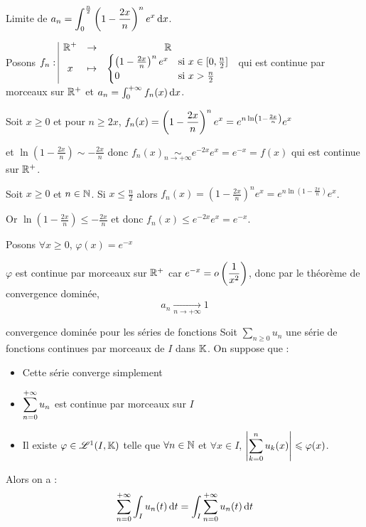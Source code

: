 \begin{exemple}
    Limite de $\displaystyle a_n = \int_{0}^{\frac n 2 } \left( 1 - \frac{2x} n \right)^n e^x \,\mathrm{d}x$.

    Posons $f_n: \space \begin{array}{|ccc} \displaystyle \mathbb{R}^+ & \to & \displaystyle \mathbb{R} \\ \displaystyle x & \mapsto & \displaystyle \begin{cases}
        \left( 1 - \frac{2x} n \right)^n e^x & \text{si } x \in [0, \frac n 2] \\
        0 & \text{si } x > \frac n 2
    \end{cases} \end{array}$ qui est continue par morceaux sur $\mathbb{R}^+$ et 
    $a_n = \int_0^{+ \infty} f_n(x) \,\mathrm{d}x$.

    \avspace Soit $x \geqslant 0$ et pour $n \geqslant 2x$, 
    $\displaystyle f_n(x) = \left( 1 - \frac{2x} n \right)^n e^x = e^{n \ln \left( 1 - \frac{2x} n \right)} e^x$

    et $\ln \left( 1 - \frac{2x} n \right) \sim - \frac{2x} n$ donc $f_n(x) \underset{n \to + \infty}{\sim} e^{-2x} e^x = e^{-x} = f(x)$ 
    qui est continue sur $\mathbb{R}^+$.

    Soit $x \geqslant 0$ et $n \in \mathbb{N}$. Si $x \leqslant \frac n 2$ alors
    $f_n(x) = \left( 1 - \frac{2x} n \right)^n e^x = e^{n \ln \left( 1 - \frac{2x} n \right)} e^x$.
    
    Or $\ln \left( 1 - \frac{2x} n \right) \leqslant - \frac{2x} n$  
    et donc $f_n(x) \leqslant e^{-2x} e^x = e^{-x}$.

    Posons $\forall x \geqslant 0$, $\varphi(x) = e^{-x}$ 

    $\varphi$ est continue par morceaux sur $\mathbb{R}^+$ car $\displaystyle e^{-x} = o\left( \frac 1 {x^2} \right)$, 
    donc par le théorème de convergence dominée, 
    $$a_n \xrightarrow[n \to + \infty]{} 1$$
\end{exemple}

\begin{theoreme}{convergence dominée pour les séries de fonctions}{}
    Soit $\sum_{n \geqslant 0} u_n$ une série de fonctions continues par morceaux de $I$ dans $\mathbb{K}$. 
    On suppose que : 
    \begin{itemize}
        \item Cette série converge simplement
        \item $\displaystyle \sum_{n = 0}^{+ \infty} u_n$ est continue par morceaux sur $I$
        \item Il existe $\varphi \in \mathscr L^1(I, \mathbb{K})$ telle que $\forall n \in \mathbb{N}$ 
        et $\forall x \in I$, $\displaystyle \left| \sum_{k = 0}^{n } u_k(x) \right| \leqslant \varphi(x)$.

    \end{itemize}

    Alors on a : 
    $$\sum_{n = 0}^{+\infty} \int_I u_n(t) \,\mathrm{d}t = \int_I \sum_{n = 0}^{+ \infty} u_n(t) \,\mathrm{d}t$$
\end{theoreme}

